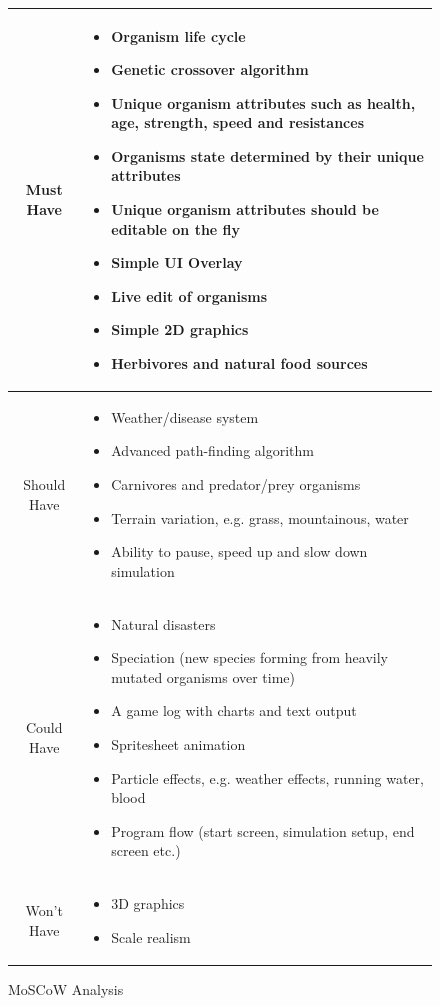 \documentclass[a4paper, oneside, 11pt]{report}
\begin{document}
\begin{figure}[H]
	\caption{MoSCoW Analysis}\label{moscow}
	\centering
	\begin{tabular}{c|p{}}
		Must Have & \begin{itemize}
			\itemsep0em
			\item Organism life cycle
			\item Genetic crossover algorithm
			\item Unique organism attributes such as health, age, strength, speed and resistances
			\item Organisms state determined by their unique attributes
			\item Unique organism attributes should be editable on the fly
			\item Simple UI Overlay
			\item Live edit of organisms
			\item Simple 2D graphics
			\item Herbivores and natural food sources
		\end{itemize} \\ \hline
		Should Have & \begin{itemize}
			\itemsep0em
			\item Weather/disease system
			\item Advanced path-finding algorithm
			\item Carnivores and predator/prey organisms
			\item Terrain variation, e.g. grass, mountainous, water
			\item Ability to pause, speed up and slow down simulation
		\end{itemize} \\ \hline
		Could Have & \begin{itemize}
			\itemsep0em
			\item Natural disasters
			\item Speciation (new species forming from heavily mutated organisms over time)
			\item A game log with charts and text output
			\item Spritesheet animation
			\item Particle effects, e.g. weather effects, running water, blood
			\item Program flow (start screen, simulation setup, end screen etc.)
		\end{itemize} \\ \hline
		Won't Have & \begin{itemize}
			\itemsep0em
			\item 3D graphics
			\item Scale realism
		\end{itemize} \\
	\end{tabular}
\end{figure}
\end{document}
